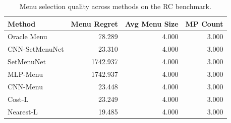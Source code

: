 \begin{table}[t]
\centering
\small
\setlength{\tabcolsep}{4pt}
\caption{Menu selection quality across methods on the RC benchmark.}
\label{tab:work2_formal_main_menu_regret}
\begin{tabular}{@{}lrrr@{}}
\hline
Method & Menu Regret & Avg Menu Size & MP Count \\
\hline
Oracle Menu & 78.289 & 4.000 & 3.000 \\
CNN-SetMenuNet & 23.310 & 4.000 & 3.000 \\
SetMenuNet & 1742.937 & 4.000 & 3.000 \\
MLP-Menu & 1742.937 & 4.000 & 3.000 \\
CNN-Menu & 23.448 & 4.000 & 3.000 \\
Cost-L & 23.249 & 4.000 & 3.000 \\
Nearest-L & 19.485 & 4.000 & 3.000 \\
\hline
\end{tabular}
\end{table}
